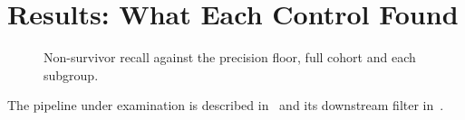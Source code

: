 \section{Results: What Each Control Found}
\label{sec:results}

\begin{figure}[t]
    \centering
    
    \caption{Non-survivor recall against the precision floor, full cohort and
    each subgroup. }
    \label{fig:recall_vs_precision}
\end{figure}

The pipeline under examination is described in~\cite{bradland_knowledge-informed_2025}
and its downstream filter in~\cite{zadorozhny_towards_nodate}.
